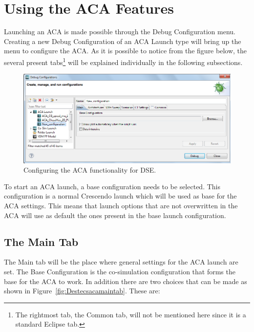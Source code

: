 \documentclass{crescendorepchap}
\begin{document}
\section{Using the ACA Features}

Launching an ACA is made possible through the Debug Configuration menu.
Creating a new Debug Configuration of an ACA Launch type will bring up
the menu to configure the ACA. As it is possible to notice from the
figure below, the several present tabs\footnote{The rightmost tab, the Common
tab, will not be mentioned here since it is a standard Eclipse tab.} will be
explained individually in the following subsections.

\begin{figure}[htbp]
\centering
\includegraphics[width=.9\textwidth]{images/DestecsACAdebugconfig.png}
\caption{Configuring the ACA functionality for DSE.}
\end{figure}

To start an ACA launch, a base configuration needs to be selected. This
configuration is a normal Crescendo launch which will be used as base for
the ACA settings. This means that launch options that are not
overwritten in the ACA will use as default the ones present in the base
launch configuration.

\subsection{The Main Tab}

The Main tab will be the place where general settings for the ACA launch
are set. The Base Configuration is the co-simulation configuration that
forms the base for the ACA to work. In addition there are two choices that can
be made as shown in Figure~\ref{fig:Destecsacamaintab}. These are:
\end{document}
